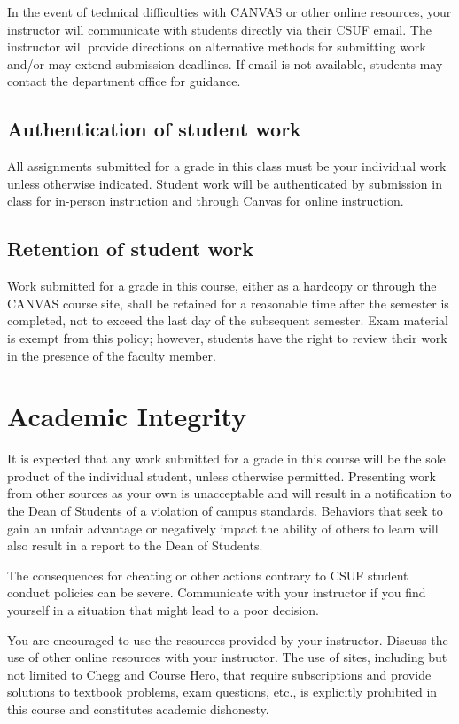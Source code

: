 \documentclass{./../latex/syllabus}
\begin{document}
In the event of technical difficulties with CANVAS or other online resources, your instructor will communicate with students directly via their CSUF email. The instructor will provide directions on alternative methods for submitting work and/or may extend submission deadlines. If email is not available, students may contact the department office for guidance.

\subsection*{Authentication of student work}

All assignments submitted for a grade in this class must be your individual work unless otherwise indicated. Student work will be authenticated by submission in class for in-person instruction and through Canvas for online instruction.

\subsection*{Retention of student work}

Work submitted for a grade in this course, either as a hardcopy or through the CANVAS course site, shall be retained for a reasonable time after the semester is completed, not to exceed the last day of the subsequent semester. Exam material is exempt from this policy; however, students have the right to review their work in the presence of the faculty member.

\section*{Academic Integrity}
It is expected that any work submitted for a grade in this course will be the sole product of the individual student, unless otherwise permitted. Presenting work from other sources as your own is unacceptable and will result in a notification to the Dean of Students of a violation of campus standards. Behaviors that seek to gain an unfair advantage or negatively impact the ability of others to learn will also result in a report to the Dean of Students.

The consequences for cheating or other actions contrary to CSUF student conduct policies can be severe. Communicate with your instructor if you find yourself in a situation that might lead to a poor decision.

You are encouraged to use the resources provided by your instructor. Discuss the use of other online resources with your instructor. The use of sites, including but not limited to Chegg and Course Hero, that require subscriptions and provide solutions to textbook problems, exam questions, etc., is explicitly prohibited in this course and constitutes academic dishonesty.
\end{document}
